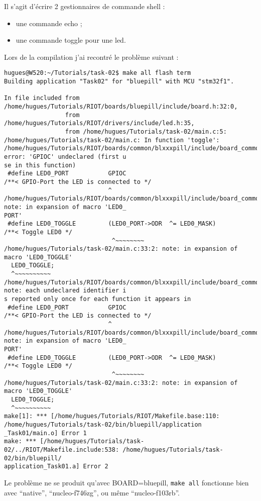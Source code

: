 Il s'agit d'écrire 2 gestionnaires de commande shell :
\begin{itemize}
	\item une commande echo ;
	\item une commande toggle pour une led.\\
\end{itemize}

Lors de la compilation j'ai recontré le problème suivant :
{\scriptsize
\begin{verbatim}
hugues@W520:~/Tutorials/task-02$ make all flash term
Building application "Task02" for "bluepill" with MCU "stm32f1".

In file included from /home/hugues/Tutorials/RIOT/boards/bluepill/include/board.h:32:0,
                 from /home/hugues/Tutorials/RIOT/drivers/include/led.h:35,
                 from /home/hugues/Tutorials/task-02/main.c:5:
/home/hugues/Tutorials/task-02/main.c: In function 'toggle':
/home/hugues/Tutorials/RIOT/boards/common/blxxxpill/include/board_common.h:36:29: error: 'GPIOC' undeclared (first u
se in this function)
 #define LED0_PORT           GPIOC                                   /**< GPIO-Port the LED is connected to */
                             ^
/home/hugues/Tutorials/RIOT/boards/common/blxxxpill/include/board_common.h:49:30: note: in expansion of macro 'LED0_
PORT'
 #define LED0_TOGGLE         (LED0_PORT->ODR  ^= LED0_MASK)          /**< Toggle LED0 */
                              ^~~~~~~~~
/home/hugues/Tutorials/task-02/main.c:33:2: note: in expansion of macro 'LED0_TOGGLE'
  LED0_TOGGLE;
  ^~~~~~~~~~~
/home/hugues/Tutorials/RIOT/boards/common/blxxxpill/include/board_common.h:36:29: note: each undeclared identifier i
s reported only once for each function it appears in
 #define LED0_PORT           GPIOC                                   /**< GPIO-Port the LED is connected to */
                             ^
/home/hugues/Tutorials/RIOT/boards/common/blxxxpill/include/board_common.h:49:30: note: in expansion of macro 'LED0_
PORT'
 #define LED0_TOGGLE         (LED0_PORT->ODR  ^= LED0_MASK)          /**< Toggle LED0 */
                              ^~~~~~~~~
/home/hugues/Tutorials/task-02/main.c:33:2: note: in expansion of macro 'LED0_TOGGLE'
  LED0_TOGGLE;
  ^~~~~~~~~~~
make[1]: *** [/home/hugues/Tutorials/RIOT/Makefile.base:110: /home/hugues/Tutorials/task-02/bin/bluepill/application
_Task01/main.o] Error 1
make: *** [/home/hugues/Tutorials/task-02/../RIOT/Makefile.include:538: /home/hugues/Tutorials/task-02/bin/bluepill/
application_Task01.a] Error 2
\end{verbatim}
}
Le problème ne se produit qu'avec BOARD=bluepill, \texttt{make all}
fonctionne bien avec \enquote{native}, \enquote{nucleo-f746zg}, ou même
\enquote{nucleo-f103rb}.\\

